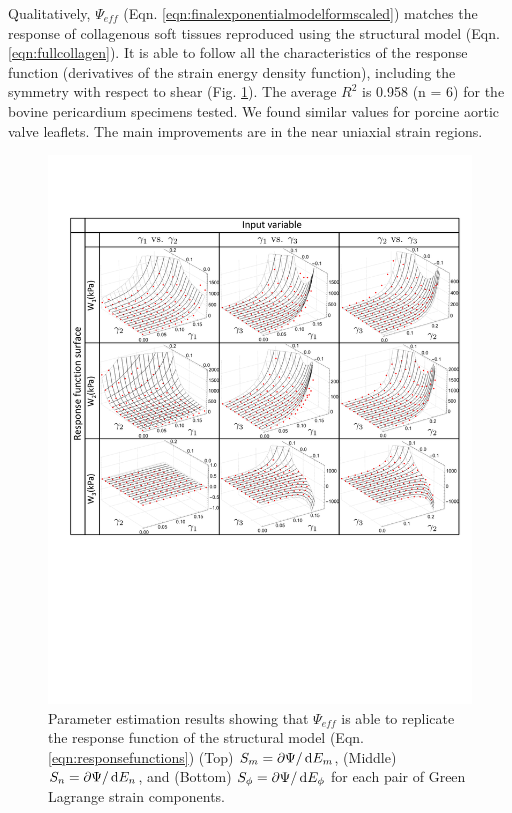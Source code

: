     
    Qualitatively, $\Psi_{eff}$ (Eqn. \ref{eqn:finalexponentialmodelformscaled}) matches the response of collagenous soft tissues reproduced using the structural model (Eqn. \ref{eqn:fullcollagen}). It is able to follow all the characteristics of the response function (derivatives of the strain energy density function), including the symmetry with respect to shear (Fig. \ref{fig:modelfit}). The average $R^2$ is 0.958 (n = 6) for the bovine pericardium specimens tested. We found similar values for porcine aortic valve leaflets. The main improvements are in the near uniaxial strain regions. 
\begin{figure}[hptb]
\centering
\includegraphics[width=\textwidth]{Images/chapter5/modelfit}
\caption{Parameter estimation results showing that $\Psi_{eff}$ is able to replicate the response function of the structural model (Eqn. \ref{eqn:responsefunctions}) (Top) $S_m = \partial\Psi/\dif E_m$, (Middle) $S_n = \partial\Psi/\dif E_n$, and (Bottom) $S_\phi = \partial\Psi/\dif E_\phi$ for each pair of Green Lagrange strain components.}
\label{fig:modelfit}
\end{figure} 


